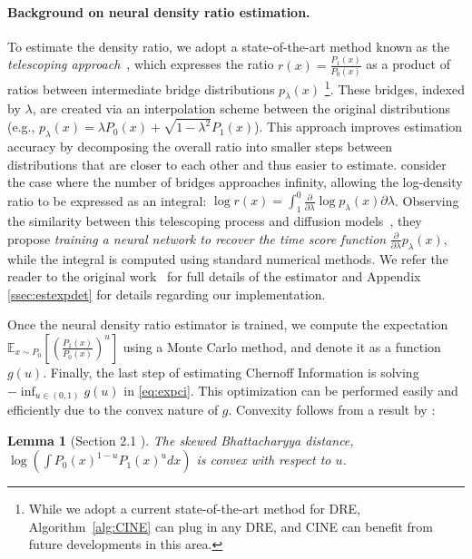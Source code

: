 \documentclass[11pt,letterpaper]{article}
\newtheorem{lemma}{Lemma}
\begin{document}
\paragraph{Background on neural density ratio estimation.} To estimate the density ratio, we adopt a state-of-the-art method known as the  \textit{telescoping approach}~\citep{choi2022density, rhodes2020telescoping}, which expresses the ratio $r(x) = \frac{P_1(x)}{P_0(x)}$ as a product of ratios between intermediate bridge distributions $p_\lambda(x)$ \footnote{While we adopt a current state-of-the-art method for DRE, Algorithm~\ref{alg:CINE} can plug in any DRE, and CINE can benefit from future developments in this area.}. These bridges, indexed by $\lambda$, are created via an interpolation scheme between the original distributions (e.g., $p_\lambda(x) = \lambda P_0(x) + \sqrt{1 - \lambda^2} P_1(x)$). This approach improves estimation accuracy by decomposing the overall ratio into smaller steps between distributions that are closer to each other and thus easier to estimate.
\citet{choi2022density} consider the case where the number of bridges approaches infinity, allowing the log-density ratio to be expressed as an integral: $\log r(x) = \int_1^0\frac{\partial}{\partial \lambda}\log p_\lambda(x)\partial\lambda$.  Observing the similarity between this telescoping process and diffusion models~\citep{nichol2021improved, song2021maximum}, they propose \textit{training a neural network to recover the time score function} $\frac{\partial}{\partial \lambda}p_\lambda(x)$, while the integral is computed using standard numerical methods. We refer the reader to the original work~\citep{choi2022density} for full details of the estimator and Appendix \ref{ssec:estexpdet} for details regarding our implementation. 


Once the neural density ratio estimator is trained, we compute the expectation 
$\mathbb{E}_{x\sim P_0}[(\frac{P_1(x)}{P_0(x)})^u]$ using a Monte Carlo method, and denote it as a function $g(u)$. Finally, the last step of estimating Chernoff Information is solving $-\inf_{u \in (0,1)}g(u)$ in \eqref{eq:expci}. This optimization can be performed easily and efficiently due to the convex nature of $g$. Convexity follows from a result by \citet{nielsen2022revisiting}:
\begin{lemma} [Section 2.1 \citep{nielsen2022revisiting}] \label{lemma:convex}
The skewed Bhattacharyya distance, $\log(\int P_0(x)^{1-u}P_1(x)^udx)$ is convex with respect to $u$.
\end{lemma}
\end{document}
